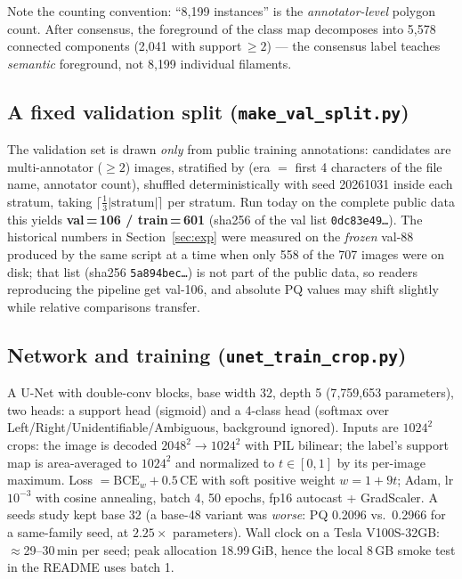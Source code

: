 \documentclass[11pt]{article}
\begin{document}
Note the counting convention: ``8{,}199 instances'' is the
\emph{annotator-level} polygon count. After consensus, the foreground of
the class map decomposes into 5{,}578 connected components
(2{,}041 with support\,$\ge2$) --- the consensus label teaches
\emph{semantic} foreground, not 8{,}199 individual filaments.

\subsection{A fixed validation split (\texttt{make\_val\_split.py})}
The validation set is drawn \emph{only} from public training annotations:
candidates are multi-annotator ($\ge2$) images, stratified by
(era $=$ first 4 characters of the file name, annotator count), shuffled
deterministically with seed 20261031 inside each stratum, taking
$\lceil \tfrac13 |\text{stratum}|\rceil$ per stratum. Run today on the
complete public data this yields \textbf{val\,=\,106 / train\,=\,601}
(sha256 of the val list \texttt{0dc83e49\dots}). The historical numbers in
Section~\ref{sec:exp} were measured on the \emph{frozen} val-88 produced
by the same script at a time when only 558 of the 707 images were on disk;
that list (sha256 \texttt{5a894bec\dots}) is not part of the public data,
so readers reproducing the pipeline get val-106, and absolute PQ values
may shift slightly while relative comparisons transfer.

\subsection{Network and training (\texttt{unet\_train\_crop.py})}
A U-Net with double-conv blocks, base width 32, depth 5
(7{,}759{,}653 parameters), two heads: a support head (sigmoid) and a
4-class head (softmax over Left/Right/Unidentifiable/Ambiguous, background
ignored). Inputs are $1024^2$ crops: the image is decoded
$2048^2\!\to\!1024^2$ with PIL bilinear; the label's support map is
area-averaged to $1024^2$ and normalized to $t\in[0,1]$ by its per-image
maximum. Loss $=\mathrm{BCE}_w + 0.5\,\mathrm{CE}$ with soft positive
weight $w = 1 + 9t$; Adam, lr $10^{-3}$ with cosine annealing, batch 4,
50 epochs, fp16 autocast + GradScaler. A seeds study kept base 32
(a base-48 variant was \emph{worse}: PQ 0.2096 vs.\ 0.2966 for a same-family
seed, at $2.25\times$ parameters). Wall clock on a Tesla V100S-32GB:
$\approx$29--30\,min per seed; peak allocation 18.99\,GiB, hence the local
8\,GB smoke test in the README uses batch 1.
\end{document}
